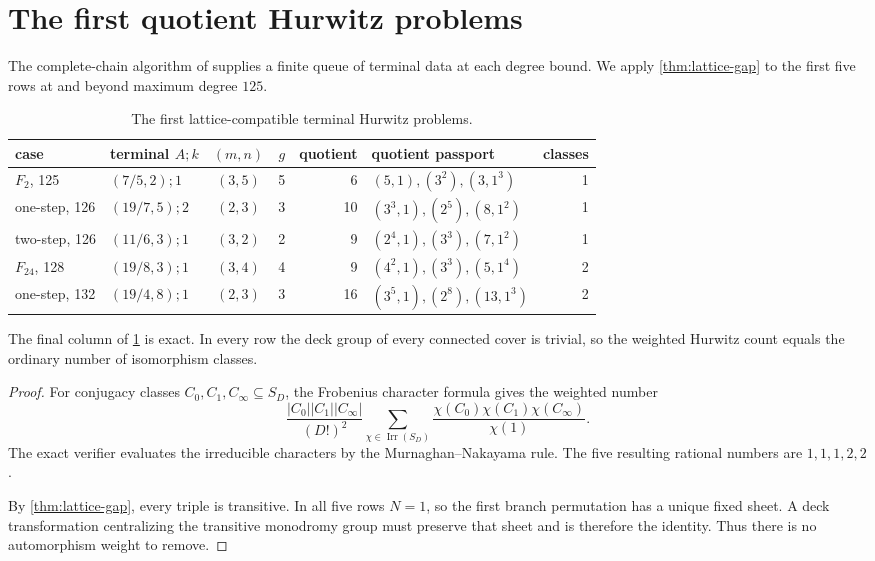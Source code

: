 \documentclass[11pt,reqno]{amsart}
\begin{document}
\section{The first quotient Hurwitz problems}
\label{sec:queue}

The complete-chain algorithm of
\cite{guccioneEtAl2017algorithms,guccioneEtAl2022degree108} supplies a
finite queue of terminal data at each degree bound.  We apply
\cref{thm:lattice-gap} to the first five rows at and beyond maximum degree
\(125\).

\begin{table}[ht]
\centering
\small
\begin{tabular}{@{}llcrrlr@{}}
\toprule
case & terminal \(A;k\) & \((m,n)\) & \(g\) & quotient
& quotient passport & classes\\
\midrule
\(F_2\), 125
& \((7/5,2);1\) & \((3,5)\) & 5 & 6
& \((5,1),(3^2),(3,1^3)\) & 1\\
one-step, 126
& \((19/7,5);2\) & \((2,3)\) & 3 & 10
& \((3^3,1),(2^5),(8,1^2)\) & 1\\
two-step, 126
& \((11/6,3);1\) & \((3,2)\) & 2 & 9
& \((2^4,1),(3^3),(7,1^2)\) & 1\\
\(F_{24}\), 128
& \((19/8,3);1\) & \((3,4)\) & 4 & 9
& \((4^2,1),(3^3),(5,1^4)\) & 2\\
one-step, 132
& \((19/4,8);1\) & \((2,3)\) & 3 & 16
& \((3^5,1),(2^8),(13,1^3)\) & 2\\
\bottomrule
\end{tabular}
\caption{The first lattice-compatible terminal Hurwitz problems.}
\label{tab:queue}
\end{table}

\begin{proposition}
\label{prop:hurwitz-count}
The final column of \cref{tab:queue} is exact.  In every row the deck group
of every connected cover is trivial, so the weighted Hurwitz count equals
the ordinary number of isomorphism classes.
\end{proposition}

\begin{proof}
For conjugacy classes \(C_0,C_1,C_\infty\subseteq S_D\), the Frobenius
character formula gives the weighted number
\[
\frac{|C_0||C_1||C_\infty|}{(D!)^2}
\sum_{\chi\in\operatorname{Irr}(S_D)}
\frac{\chi(C_0)\chi(C_1)\chi(C_\infty)}{\chi(1)}.
\]
The exact verifier evaluates the irreducible characters by the
Murnaghan--Nakayama rule.  The five resulting rational numbers are
\(1,1,1,2,2\).

By \cref{thm:lattice-gap}, every triple is transitive.  In all five rows
\(N=1\), so the first branch permutation has a unique fixed sheet.  A deck
transformation centralizing the transitive monodromy group must preserve
that sheet and is therefore the identity.  Thus there is no automorphism
weight to remove.
\end{proof}
\end{document}
